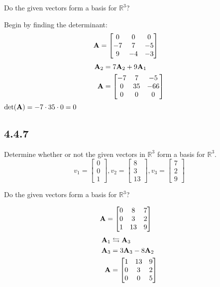 \documentclass{article}
\begin{document}
Do the given vectors form a basis for $ \mathbb{R}^3 $?

Begin by finding the determinant:
\begin{align*}
	\mathbf{A} & =
		\begin{bmatrix}
			0 & 0 & 0 \\
			-7 & 7 & -5 \\
			9 & -4 & -3
		\end{bmatrix}
\end{align*}
\begin{align*}
	\mathbf{A}_2 & = 7\mathbf{A}_2 + 9\mathbf{A}_1 \\
	\mathbf{A} & =
		\begin{bmatrix}
			-7 & 7 & -5 \\
			0 & 35 & -66 \\
			0 & 0 & 0
		\end{bmatrix}
\end{align*}
$ \det(\mathbf{A}) = -7 \cdot 35 \cdot 0 = 0 $

\subsection{4.4.7}

Determine whether or not the given vectors in $ \mathbb{R}^3 $ form a basis for $ \mathbb{R}^3 $.
\begin{equation*}
	v_1 = \begin{bmatrix} 0 \\ 0 \\ 1 \end{bmatrix},
	v_2 = \begin{bmatrix} 8 \\ 3 \\ 13 \end{bmatrix},
	v_3 = \begin{bmatrix} 7 \\ 2 \\ 9 \end{bmatrix}
\end{equation*}

Do the given vectors form a basis for $ \mathbb{R}^3 $?

\begin{align*}
	\mathbf{A} & =
		\begin{bmatrix}
			0 & 8 & 7 \\
			0 & 3 & 2 \\
			1 & 13 & 9
		\end{bmatrix}
\end{align*}
\begin{align*}
	\mathbf{A}_1 & \leftrightarrows \mathbf{A}_3 \\
	\mathbf{A}_3 & = 3\mathbf{A}_3 - 8\mathbf{A}_2 \\
	\mathbf{A} & =
		\begin{bmatrix}
			1 & 13 & 9 \\
			0 & 3 & 2 \\
			0 & 0 & 5
		\end{bmatrix}
\end{align*}
\end{document}
